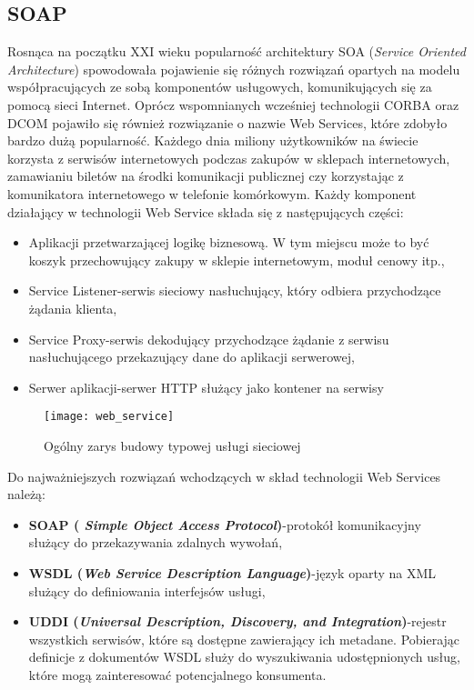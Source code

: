 \subsection{SOAP}
Rosnąca na początku XXI wieku popularność architektury SOA (\textit{Service Oriented Architecture}) spowodowała pojawienie się różnych rozwiązań opartych na modelu współpracujących ze sobą komponentów usługowych, komunikujących się za pomocą sieci Internet. Oprócz wspomnianych wcześniej technologii CORBA oraz DCOM pojawiło się również rozwiązanie o nazwie Web Services, które zdobyło bardzo dużą popularność. Każdego dnia miliony użytkowników na świecie korzysta z serwisów internetowych podczas zakupów w sklepach internetowych, zamawianiu biletów na środki komunikacji publicznej czy korzystając z komunikatora internetowego w telefonie komórkowym. Każdy komponent działający w technologii Web Service składa się z następujących części\cite{snell2002programming}:
\begin{itemize}
  \item Aplikacji przetwarzającej logikę biznesową. W tym miejscu może to być koszyk przechowujący zakupy w sklepie internetowym, moduł cenowy itp.,
  \item Service Listener-serwis sieciowy nasłuchujący, który odbiera przychodzące żądania klienta,
  \item  Service Proxy-serwis dekodujący przychodzące żądanie z serwisu nasłuchującego przekazujący dane do aplikacji serwerowej,
  \item Serwer aplikacji-serwer HTTP służący jako kontener na serwisy
\end{itemize}
\begin{figure}[ht]
  \caption{Ogólny zarys budowy typowej usługi sieciowej}
  \texttt{[image: web\_service]}
  \centering
\end{figure}
\newpage
\noindent
Do najważniejszych rozwiązań wchodzących w skład technologii Web Services należą:
\begin{itemize}
  \item \textbf{SOAP (\textit{ Simple Object Access Protocol})}-protokół komunikacyjny służący do przekazywania zdalnych wywołań,
  \item \textbf{WSDL (\textit{Web Service Description Language})}-język oparty na XML służący do definiowania interfejsów usługi,
  \item \textbf{UDDI (\textit{Universal Description, Discovery, and Integration})}-rejestr wszystkich serwisów, które są dostępne zawierający ich metadane. Pobierając definicje z dokumentów WSDL służy do wyszukiwania udostępnionych usług, które mogą zainteresować potencjalnego konsumenta.
\end{itemize}
